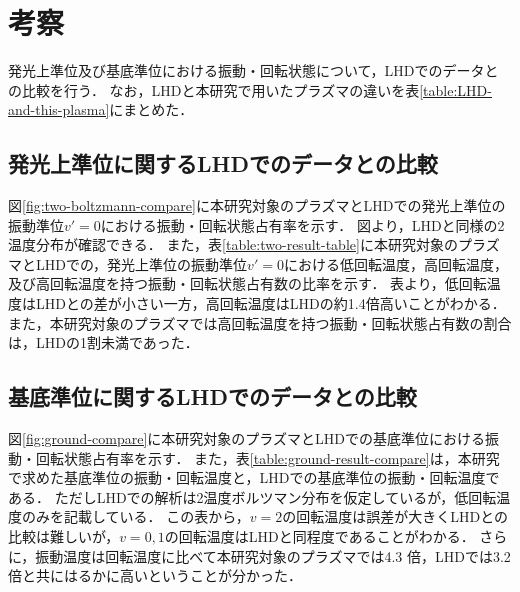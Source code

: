 \chapter{考察}
発光上準位及び基底準位における振動・回転状態について，LHDでのデータとの比較を行う．
なお，LHDと本研究で用いたプラズマの違いを表\ref{table:LHD-and-this-plasma}にまとめた\cite{ishihara}．

\section{発光上準位に関するLHDでのデータとの比較}
図\ref{fig:two-boltzmann-compare}に本研究対象のプラズマとLHDでの発光上準位の振動準位$v'=0$における振動・回転状態占有率を示す．
図より，LHDと同様の2温度分布が確認できる．
また，表\ref{table:two-result-table}に本研究対象のプラズマとLHDでの，発光上準位の振動準位$v'=0$における低回転温度，高回転温度，及び高回転温度を持つ振動・回転状態占有数の比率を示す．
表より，低回転温度はLHDとの差が小さい一方，高回転温度はLHDの約1.4倍高いことがわかる．
また，本研究対象のプラズマでは高回転温度を持つ振動・回転状態占有数の割合は，LHDの1割未満であった．

\section{基底準位に関するLHDでのデータとの比較}
図\ref{fig:ground-compare}に本研究対象のプラズマとLHDでの基底準位における振動・回転状態占有率を示す．
また，表\ref{table:ground-result-compare}は，本研究で求めた基底準位の振動・回転温度と，LHDでの基底準位の振動・回転温度\cite{ishihara}である．
ただしLHDでの解析は2温度ボルツマン分布を仮定しているが，低回転温度のみを記載している．
この表から，$v=2$の回転温度は誤差が大きくLHDとの比較は難しいが，$v=0,1$の回転温度はLHDと同程度であることがわかる．
さらに，振動温度は回転温度に比べて本研究対象のプラズマでは4.3 倍，LHDでは3.2 倍と共にはるかに高いということが分かった．
